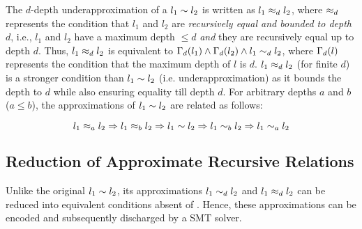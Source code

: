 The $d$-depth underapproximation of a \recursiveRelation{} $l_1 \sim{} l_2$
is written as $l_1 \approx_{d} l_2$, where $\approx_{d}$ represents
the condition that $l_1$ and $l_2$ are {\em recursively equal and bounded to depth $d$},
i.e., $l_1$ and $l_2$ have a maximum depth $\leq d$ {\em and}
they are recursively equal up to depth $d$.
Thus, $l_1 \approx_{d} l_2$ is equivalent to
$\Gamma_{d}(l_1) \land \Gamma_{d}(l_2) \land l_1 \sim_{d} l_2$,
where $\Gamma_{d}(l)$ represents the condition that the maximum
depth of $l$ is $d$.
$l_1 \approx_{d} l_2$ (for finite $d$) is a stronger condition than
$l_1\sim{}l_2$ (i.e. underapproximation)
as it bounds the depth to $d$ while also ensuring equality till depth $d$.
For arbitrary depths $a$ and $b$ ($a \leq b$),
the approximations of $l_1 \sim{} l_2$ are related as follows:

\begin{equation}
\label{eqn:approxrels}
l_1 \approx_{a} l_2 \Rightarrow l_1 \approx_{b} l_2 \Rightarrow l_1 \sim{} l_2 \Rightarrow l_1 \sim_{b} l_2 \Rightarrow l_1 \sim_{a} l_2
\end{equation}

\subsection{Reduction of Approximate Recursive Relations}
\label{sec:approxdecomp}
Unlike the original \recursiveRelation{} $l_1 \sim{} l_2$,
its approximations $l_1\sim_{d}l_2$ and $l_1\approx_{d}l_2$ can be reduced into
equivalent conditions absent of \recursiveRelations{}.
Hence, these approximations can be encoded and subsequently discharged by a SMT solver.

